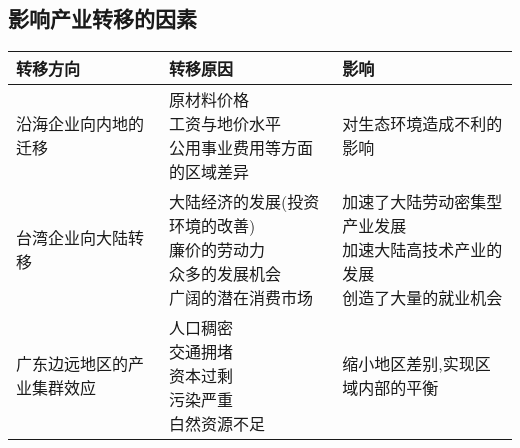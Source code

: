 \documentclass[a4paper]{article}
\begin{document}
    \subsection{影响产业转移的因素}
        \begin{tabular}{|p{20mm}|l|p{60mm}|}
            \hline
            转移方向 &   转移原因    &   影响    \\
            \hline
            沿海企业向内地的迁移  &  \makecell[l]{原材料价格 \\ 工资与地价水平 \\ 公用事业费用等方面的区域差异}  &  对生态环境造成不利的影响    \\
            \hline
            台湾企业向大陆转移  &  \makecell[l]{大陆经济的发展(投资环境的改善) \\ 廉价的劳动力 \\ 众多的发展机会 \\ 广阔的潜在消费市场}  &   \makecell[l]{加速了大陆劳动密集型产业发展\\加速大陆高技术产业的发展 \\ 创造了大量的就业机会} \\
            \hline
            广东边远地区的产业集群效应  &  \makecell[l]{人口稠密 \\ 交通拥堵 \\ 资本过剩 \\ 污染严重 \\ 白然资源不足}   &   缩小地区差别,实现区域内部的平衡 \\
            \hline
        \end{tabular}
\end{document}
